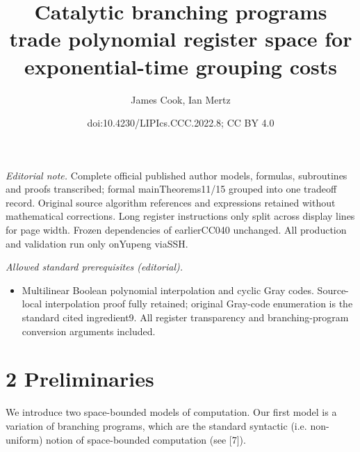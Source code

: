 \documentclass[10pt,a4paper]{article}
\title{Catalytic branching programs trade polynomial register space for exponential-time grouping costs}
\author{James Cook, Ian Mertz}
\date{doi:10.4230/LIPIcs.CCC.2022.8; CC BY 4.0}
\begin{document}
\maketitle
\noindent\textit{Editorial note.} Complete official published author models, formulas, subroutines and proofs transcribed; formal mainTheorems11/15 grouped into one tradeoff record. Original source algorithm references and expressions retained without mathematical corrections. Long register instructions only split across display lines for page width. Frozen dependencies of earlierCC040 unchanged. All production and validation run only onYupeng viaSSH.\par\medskip
\noindent\textit{Allowed standard prerequisites (editorial).}\begin{itemize}
\item Multilinear Boolean polynomial interpolation and cyclic Gray codes. Source-local interpolation proof fully retained; original Gray-code enumeration is the standard cited ingredient9. All register transparency and branching-program conversion arguments included.
\end{itemize}\medskip
\section*{2 Preliminaries}
We introduce two space-bounded models of computation. Our first model is a variation of branching programs, which are the standard syntactic (i.e. non-uniform) notion of space-bounded computation (see [7]).
\end{document}
